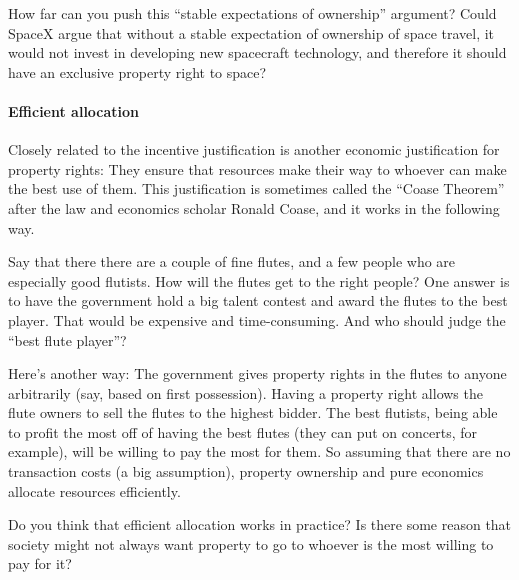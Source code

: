 How far can you push this ``stable expectations of ownership'' argument? Could
SpaceX argue that without a stable expectation of ownership of space travel, it
would not invest in developing new spacecraft technology, and therefore it
should have an exclusive property right to space?

\paragraph{Efficient allocation} Closely related to the incentive justification
is
another economic justification for property rights: They ensure that resources
make their way to whoever can make the best use of them. This justification is
sometimes called the ``Coase Theorem'' after the law and economics scholar
Ronald Coase, and it works in the following way.

Say that there there are a couple of fine flutes, and a few people who are
especially good flutists. How will the flutes get to the right people? One
answer is to have the government hold a big talent contest and award the flutes
to the best player. That would be expensive and
time-consuming. And who should judge the ``best flute player''?

Here's another way: The government gives property rights in the flutes to
anyone arbitrarily (say, based on first possession). Having a property right
allows the flute owners to sell the flutes to the highest bidder. The best
flutists,
being able to profit the most off of having the best flutes (they can put on
concerts, for example), will be willing to pay the most for them. So assuming
that there are no transaction costs (a big assumption), property ownership and
pure economics allocate resources efficiently.

Do you think that efficient allocation works in practice? Is
there some reason that society might not always want property to go to whoever
is the most willing to pay for it?





